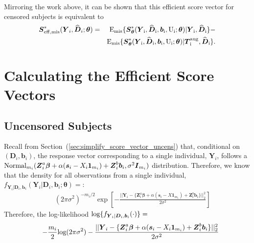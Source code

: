 \documentclass[12pt]{article}
\def\log{\hbox{log}}
\def\Normal{\hbox{Normal}}
\def\bse{\begin{eqnarray*}}
\def\ese{\end{eqnarray*}}
\def\be{\begin{eqnarray}}
\def\ee{\end{eqnarray}}
\def\bse{\begin{eqnarray*}}
\def\ese{\end{eqnarray*}}
\def\bS{{\mathbf S}}
\def\bbeta{{\boldsymbol{\beta}}}
\def\btheta{{\boldsymbol{\theta}}}
\def\bone{{\boldsymbol{1}}}
\def\bb{{\boldsymbol b}}
\def\bs{{\boldsymbol s}}
\def\bD{{\boldsymbol D}}
\def\bI{{\boldsymbol I}}
\def\bS{{\boldsymbol S}}
\def\bT{{\boldsymbol T}}
\def\bY{{\boldsymbol Y}}
\def\bZ{{\boldsymbol Z}}
\def\tilD{\bD}
\def\E{\rm E}
\begin{document}
Mirroring the work above, it can be shown that this efficient score vector for censored subjects is equivalent to %
\bse
\bS_{\rm eff, mis}^*(\bY_i,\widehat{\tilD}_i;\btheta)&=&\E_{\rm{mis}}\{\bS_{\btheta}^*(\bY_i,\widehat{\tilD}_i,\bb_i,U_i;\btheta)|\bY_i,\widehat{\tilD}_i\}-\\
&&\E_{\rm{mis}}\{\bS_{\btheta}^*(\bY_i,\widehat{\tilD}_i,\bb_i,U_i;\btheta)|\bT_i^{\rm aug},\widehat{\tilD}_i\}.
\ese

\section{Calculating the Efficient Score Vectors}
\label{sec:calcs}
\subsection{Uncensored Subjects}
\label{sec:calcs_uncens}
Recall from Section~(\ref{sec:simplify_score_vector_uncens}) that, conditional on $(\tilD_i, \bb_i)$, the response vector corresponding to a single individual, $\bY_i$, follows a $\Normal_{m_i}(\bZ_i^a\bbeta  + \alpha(\bs_i - X_i\bone_{m_i}) + \bZ_i^b\bb_i, \sigma^2\bI_{m_i})$ distribution. Therefore, we know that the density for all observations from a single individual, $f_{\bY_i|\tilD_i,\bb_i}(\bY_i|\tilD_i,\bb_i;\btheta)=$:
\bse
&&(2\pi\sigma^2)^{-m_i/2}\exp\left[-\frac{||\bY_i-\{\bZ_i^a\bbeta  + \alpha(\bs_i - X\bone_{m_i}) + \bZ_i^b\bb_i\}||^2_2}{2\sigma^2}\right]
\ese
Therefore, the log-likelihood $\log\{f_{\bY_i|\tilD_i,\bb_i}(\cdot)\}=$
\be
\label{eqn:log_lik_uncens}
&&-\frac{m_i}{2}\log(2\pi\sigma^2)-\frac{||\bY_i-\{\bZ_i^a\bbeta  + \alpha(\bs_i - X_i\bone_{m_i}) + \bZ_i^b\bb_i\}||^2_2}{2\sigma^2}
\ee
\end{document}
